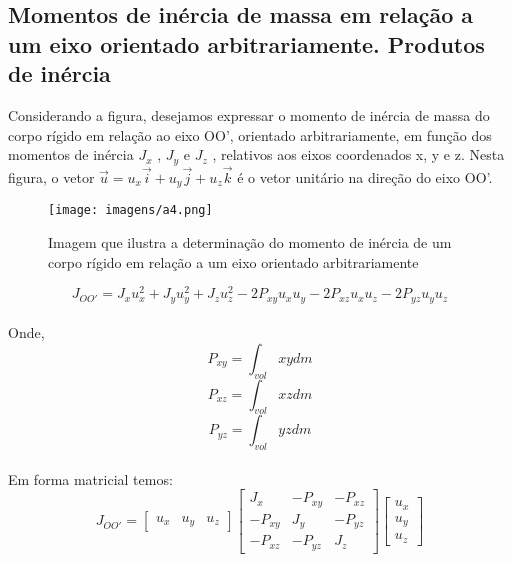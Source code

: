 \documentclass[a4paper, 12pt]{article}
\begin{document}
	\subsection{Momentos de inércia de massa em relação a um eixo orientado arbitrariamente. Produtos de inércia}
		Considerando a figura, desejamos expressar o momento de inércia de massa do corpo rígido em relação ao eixo OO', orientado arbitrariamente, em função dos momentos de inércia $J_x$ , $J_y$ e $J_z$ , relativos aos eixos coordenados x, y e z. Nesta figura, o vetor $\vec{u}= u_x \vec{i}+ u_y\vec{j} + u_z\vec{k}$ é o vetor unitário na direção do eixo OO'.
		\begin{figure}[h]
			\center
			\texttt{[image: imagens/a4.png]} 
			\caption{Imagem que ilustra a determinação do momento de inércia de um corpo rígido em relação a um eixo orientado arbitrariamente}
		\end{figure}	
		\begin{equation}
			J_{OO'} = J_xu_x^2 + J_yu_y^2 + J_zu_z^2 - 2 P_{xy}u_xu_y- 2 P_{xz}u_xu_z - 2 P_{yz}u_yu_z
		\end{equation}
		\\
		
		Onde,
		\begin{equation}
			P_{xy} = \int_{vol} xydm
		\end{equation}
		\begin{equation}
			P_{xz} = \int_{vol} xzdm
		\end{equation}
		\begin{equation}
			P_{yz} = \int_{vol} yzdm
		\end{equation}\\
		
		Em forma matricial temos:
		\begin{equation}
			J_{OO'} = \begin{bmatrix}
			u_x & u_y & u_z 
			\end{bmatrix}\begin{bmatrix}
			J_x & -P_{xy} & -P_{xz}\\
			-P_{xy} & J_y & -P_{yz}\\
			-P_{xz} & -P_{yz} & J_z
\end{bmatrix}\begin{bmatrix}
			u_x\\ u_y \\u_z
\end{bmatrix}				
		\end{equation}
\end{document}
